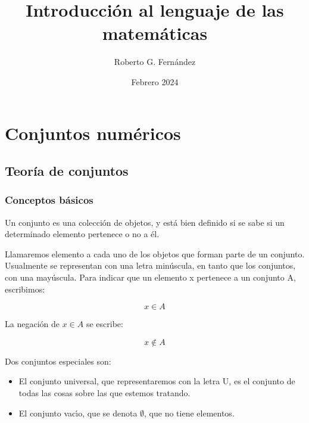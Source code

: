 \documentclass{article}
\title{Introducci\'on al lenguaje de las matem\'aticas}
\author{Roberto G. Fernández}
\date{Febrero 2024}
\begin{document}
\maketitle


\section{Conjuntos num\'ericos}
\subsection{Teor\'ia de conjuntos}

\subsubsection{Conceptos b\'asicos}
Un conjunto es una colecci\'on de objetos, y est\'a bien
definido si se sabe si un determinado elemento pertenece o no
a \'el.

Llamaremos elemento a cada uno de los objetos que forman parte de un conjunto. Usualmente se representan con una letra min\'uscula, en tanto que los conjuntos, con una may\'uscula.
Para indicar que un elemento x pertenece a un conjunto A, escribimos:

\begin{equation}
x \in A
\end{equation}

La negaci\'on de \begin{math}x \in A\end{math} se escribe:

\begin{equation}
x \notin A
\end{equation}

Dos conjuntos especiales son:
\begin{itemize}
  \item El conjunto universal, que representaremos con la letra U, es el conjunto de todas las cosas sobre las que estemos tratando.
  \item El conjunto vac\'ıo, que se denota \begin{math}\emptyset\end{math}, que no tiene elementos.
\end{itemize}
\end{document}
